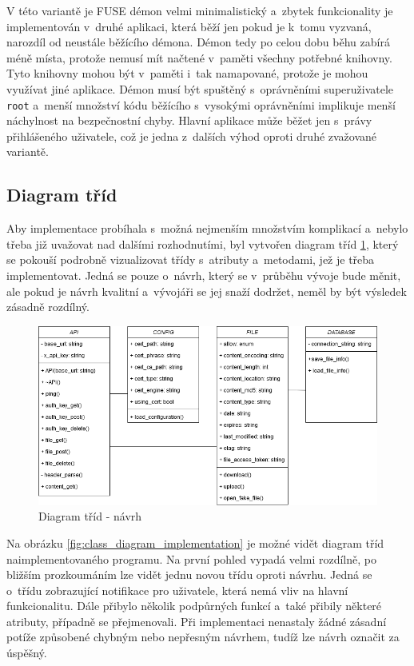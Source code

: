 V této variantě je FUSE démon velmi minimalistický a zbytek funkcionality je implementován v druhé aplikaci, která běží jen pokud je k tomu vyzvaná, narozdíl od neustále
běžícího démona. Démon tedy po celou dobu běhu zabírá méně místa, protože nemusí mít načtené v paměti všechny potřebné knihovny. Tyto knihovny mohou být v paměti i tak
namapované, protože je mohou využívat jiné aplikace. Démon musí být spuštěný s oprávněními superuživatele \texttt{root} a menší množství kódu běžícího s vysokými
oprávněními implikuje menší náchylnost na bezpečnostní chyby. Hlavní aplikace může běžet jen s právy přihlášeného uživatele, což je jedna z dalších výhod oproti 
druhé zvažované variantě.

\subsection{Diagram tříd}

Aby implementace probíhala s možná nejmenším množstvím komplikací a nebylo třeba již uvažovat nad dalšími rozhodnutími, byl vytvořen diagram tříd \ref{fig:class_diagram_design},
který se pokouší podrobně vizualizovat třídy s atributy a metodami, jež je třeba implementovat. Jedná se pouze o návrh, který se v průběhu vývoje bude měnit, ale pokud je návrh
kvalitní a vývojáři se jej snaží dodržet, neměl by být výsledek zásadně rozdílný.

\begin{figure}[h]
    \centering
    \includegraphics[width=1\linewidth]{other-fig/class_diagram_design.png}
    \caption{Diagram tříd - návrh}
    \label{fig:class_diagram_design}
\end{figure}

Na obrázku \ref{fig:class_diagram_implementation} je možné vidět diagram tříd naimplementovaného programu. Na první pohled vypadá velmi rozdílně, po bližším prozkoumáním
lze vidět jednu novou třídu oproti návrhu. Jedná se o třídu zobrazující notifikace pro uživatele, která nemá vliv na hlavní funkcionalitu. Dále přibylo několik podpůrných
funkcí a také přibily některé atributy, případně se přejmenovali. Při implementaci nenastaly žádné zásadní potíže způsobené chybným nebo nepřesným návrhem, tudíž lze
návrh označit za úspěšný.


